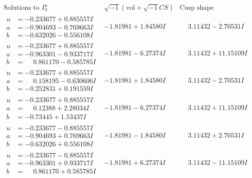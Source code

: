 \documentclass[1p]{elsarticle_modified}
\theoremstyle{definition}
\newcommand{\I}{\sqrt{-1}}
\begin{document}
$$\begin{array}{c|c|c}  
\text{Solutions to }I^u_{3}& \I (\text{vol} + \sqrt{-1}CS) & \text{Cusp shape}\\
 \hline 
\begin{aligned}
u &= -0.233677 + 0.885557 I \\
a &= -0.904693 - 0.769663 I \\
b &= -0.632026 - 0.556108 I\end{aligned}
 & -1.81981 + 1.84580 I & \phantom{-}3.11432 - 2.70531 I \\ \hline\begin{aligned}
u &= -0.233677 + 0.885557 I \\
a &= -0.963301 - 0.933717 I \\
b &= \phantom{-}0.861170 - 0.585785 I\end{aligned}
 & -1.81981 - 6.27374 I & \phantom{-}3.11432 + 11.15109 I \\ \hline\begin{aligned}
u &= -0.233677 + 0.885557 I \\
a &= \phantom{-}0.158195 - 0.630606 I \\
b &= -0.252831 + 0.191559 I\end{aligned}
 & -1.81981 + 1.84580 I & \phantom{-}3.11432 - 2.70531 I \\ \hline\begin{aligned}
u &= -0.233677 + 0.885557 I \\
a &= \phantom{-}0.12388 + 2.28034 I \\
b &= -0.73445 + 1.53437 I\end{aligned}
 & -1.81981 - 6.27374 I & \phantom{-}3.11432 + 11.15109 I \\ \hline\begin{aligned}
u &= -0.233677 - 0.885557 I \\
a &= -0.904693 + 0.769663 I \\
b &= -0.632026 + 0.556108 I\end{aligned}
 & -1.81981 - 1.84580 I & \phantom{-}3.11432 + 2.70531 I \\ \hline\begin{aligned}
u &= -0.233677 - 0.885557 I \\
a &= -0.963301 + 0.933717 I \\
b &= \phantom{-}0.861170 + 0.585785 I\end{aligned}
 & -1.81981 + 6.27374 I & \phantom{-}3.11432 - 11.15109 I \\ \hline\begin{aligned}

\end{aligned}
\end{array}$$
\end{document}
